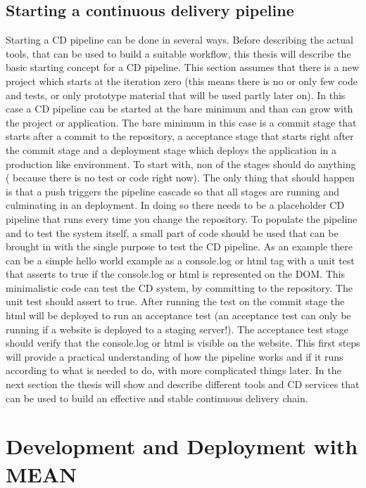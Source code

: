 \subsection{Starting a continuous delivery pipeline}
Starting a CD pipeline can be done in several ways. Before describing the actual tools, that can be used to build a suitable workflow, this thesis will describe
the basic starting concept for a CD pipeline.
This section assumes that there is a new project which starts at the iteration zero (this means there is no or only few code and tests, or
only prototype material that will be used partly later on). In this case a CD pipeline can be started at the bare minimum and than can grow with the project
or application. The bare minimum in this case is a commit stage that starts after a commit to the repository, a acceptance stage that starts right after the
commit stage and a deployment stage which deploys the application in a production like environment. To start with, non of the stages should do anything (
because there is no test or code right now). The only thing that should happen is that a push triggers the pipeline cascade so that all stages are running
and culminating in an deployment. In doing so there needs to be a placeholder CD pipeline that runs every time you change the repository. To populate the pipeline
and to test the system itself, a small part of code should be used that can be brought in with the single purpose to test the CD pipeline. As an example there
can be a simple hello world example as a console.log or html tag with a unit test that asserts to true if the console.log or html is represented on the DOM.
This minimalistic code can test the CD system, by committing to the repository. The unit test should assert to true. After running the test on the commit stage the html
will be deployed to run an acceptance test (an acceptance test can only be running if a website is deployed to a staging server!). The acceptance test stage should
verify that the console.log or html is visible on the website. This first steps will provide a practical understanding of how the pipeline works and
if it runs according to what is needed to do, with more complicated things later. In the next section the thesis will show and describe different tools
and CD services that can be used to build an effective and stable continuous delivery chain.


\newpage
\section{Development and Deployment with MEAN}
\label{section:Development and Deployment with MEAN}

